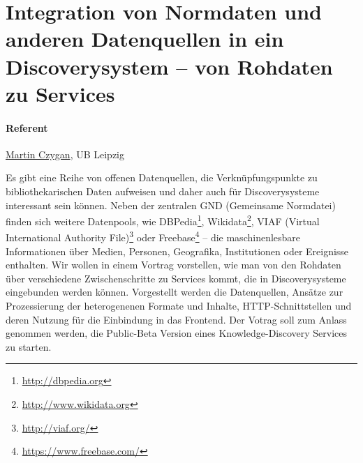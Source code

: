 \documentclass[german]{article}
\author{
Martin Czygan \\
Leipzig University Library \\
Beethovenstra\ss{}e 6 \\
04107 Leipzig \\
martin.czygan@uni-leipzig.de
}
\begin{document}
\thispagestyle{empty}
\section*{Integration von Normdaten und anderen Datenquellen in ein Discoverysystem -- von Rohdaten zu Services}

\paragraph{Referent} \href{mailto:martin.czygan@uni-leipzig.de}{Martin Czygan}, UB Leipzig\\
\vspace{0.2cm}

Es gibt eine Reihe von offenen Datenquellen,
die Verknüpfungspunkte zu bibliothekarischen Daten aufweisen und daher
auch für Discoverysysteme interessant sein können. Neben der
zentralen GND (Gemeinsame Normdatei) finden sich weitere Datenpools,
wie DBPedia\footnote{\url{http://dbpedia.org}}, Wikidata\footnote{\url{http://www.wikidata.org}},
VIAF (Virtual International Authority File)\footnote{\url{http://viaf.org/}}
oder Freebase\footnote{\url{https://www.freebase.com/}} -- die maschinenlesbare
Informationen über Medien, Personen, Geografika, Institutionen oder Ereignisse
enthalten. Wir wollen in einem Vortrag vorstellen, wie man von den
Rohdaten über verschiedene Zwischenschritte zu Services kommt, die in
Discoverysysteme eingebunden werden können. Vorgestellt werden die Datenquellen,
Ansätze zur Prozessierung der heterogenenen Formate und Inhalte,
HTTP-Schnittstellen und deren Nutzung für die Einbindung in das Frontend.
Der Votrag soll zum Anlass genommen werden, die Public-Beta Version
eines Knowledge-Discovery Services zu starten.
\end{document}
